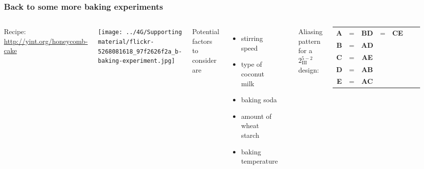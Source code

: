 \begin{frame}\frametitle{Back to some more baking experiments}
	\begin{columns}[T]
		
			\vspace{1cm}
			{\small Recipe: \href{http://yint.org/honeycomb-cake}{http://yint.org/honeycomb-cake}}
		
			\vspace{1cm}
		
			\centerline{\texttt{[image: ../4G/Supporting material/flickr-5268081618\_97f2626f2a\_b-baking-experiment.jpg]}}
			
		
			Potential factors to consider are
			\begin{itemize}
				\item	stirring speed
				\item	type of coconut milk
				\item	baking soda
				\item	amount of wheat starch
				\item	baking temperature
			\end{itemize}
			
			\vspace{0.4cm}
			\hrule
			
			\vspace{0.1cm}
			Aliasing pattern for a $2^{5-2}_{\textrm{III}}$ design:
			\begin{tabulary}{\linewidth}{ccccccc}				
				\textbf{A} & = & \textbf{BD} & = & \textbf{CE}  \\
				\textbf{B} & = & \textbf{AD} & & \\
				\textbf{C} & = & \textbf{AE} & & \\
				\textbf{D} & = & \textbf{AB} & & \\
				\textbf{E} & = & \textbf{AC} & & 
			\end{tabulary}
			
	\end{columns}
	
	\vspace{1cm}

	
\end{frame}


